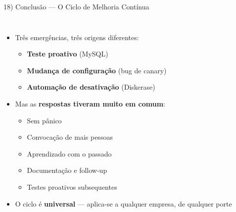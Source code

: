 \documentclass[aspectratio=169]{beamer}
\begin{document}
\begin{frame}{18) Conclusão — O Ciclo de Melhoria Contínua}

  \begin{columns}[T]
      \begin{itemize}
        \item Três emergências, três origens diferentes:
          \begin{itemize}
            \item \textbf{Teste proativo} (MySQL)
            \item \textbf{Mudança de configuração} (bug de canary)
            \item \textbf{Automação de desativação} (Diskerase)
          \end{itemize}
        \item Mas as \textbf{respostas tiveram muito em comum}:
          \begin{itemize}
            \item Sem pânico
            \item Convocação de mais pessoas
            \item Aprendizado com o passado
            \item Documentação e follow-up
            \item Testes proativos subsequentes
          \end{itemize}
        \item O ciclo é \textbf{universal} — aplica-se a qualquer empresa, de qualquer porte
      \end{itemize}

      \centering
\end{columns}
\end{frame}
\end{document}
